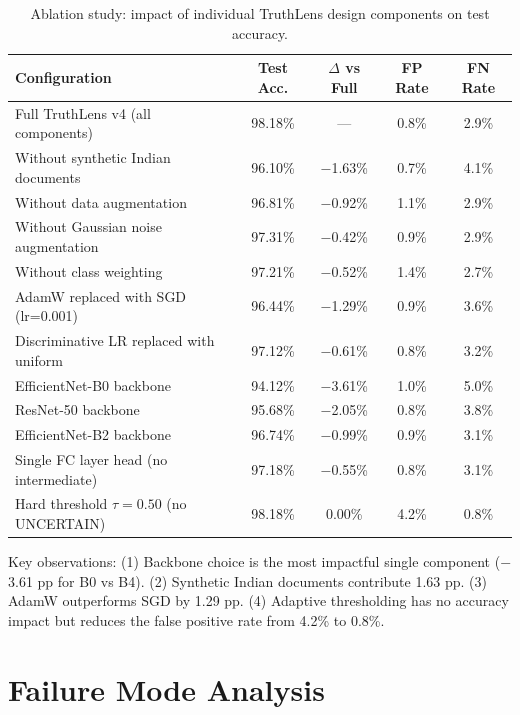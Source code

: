 \documentclass[12pt,a4paper,oneside]{report}
\begin{document}
\begin{table}[H]
\centering
\caption{Ablation study: impact of individual TruthLens design components on test accuracy.}
\label{tab:ablation_full}
\renewcommand{\arraystretch}{1.3}
\begin{tabular}{p{5.5cm}cccc}
\toprule
\textbf{Configuration} & \textbf{Test Acc.} & \textbf{$\Delta$ vs Full} & \textbf{FP Rate} & \textbf{FN Rate} \\
\midrule
Full TruthLens v4 (all components)    & 98.18\% & ---         & 0.8\%  & 2.9\%  \\
\midrule
Without synthetic Indian documents     & 96.10\% & $-$1.63\%  & 0.7\%  & 4.1\%  \\
Without data augmentation             & 96.81\% & $-$0.92\%  & 1.1\%  & 2.9\%  \\
Without Gaussian noise augmentation   & 97.31\% & $-$0.42\%  & 0.9\%  & 2.9\%  \\
Without class weighting               & 97.21\% & $-$0.52\%  & 1.4\%  & 2.7\%  \\
AdamW replaced with SGD (lr=0.001)   & 96.44\% & $-$1.29\%  & 0.9\%  & 3.6\%  \\
Discriminative LR replaced with uniform & 97.12\% & $-$0.61\% & 0.8\%  & 3.2\% \\
EfficientNet-B0 backbone              & 94.12\% & $-$3.61\%  & 1.0\%  & 5.0\%  \\
ResNet-50 backbone                    & 95.68\% & $-$2.05\%  & 0.8\%  & 3.8\%  \\
EfficientNet-B2 backbone              & 96.74\% & $-$0.99\%  & 0.9\%  & 3.1\%  \\
Single FC layer head (no intermediate)& 97.18\% & $-$0.55\%  & 0.8\%  & 3.1\%  \\
Hard threshold $\tau=0.50$ (no UNCERTAIN) & 98.18\% & 0.00\% & 4.2\%  & 0.8\%  \\
\bottomrule
\end{tabular}
\end{table}

Key observations: (1) Backbone choice is the most impactful single component
($-$3.61 pp for B0 vs B4). (2) Synthetic Indian documents contribute 1.63 pp.
(3) AdamW outperforms SGD by 1.29 pp. (4) Adaptive thresholding has no accuracy
impact but reduces the false positive rate from 4.2\% to 0.8\%.

\section{Failure Mode Analysis}
\label{sec:failure_ch4}
\end{document}
